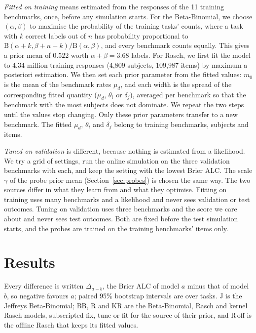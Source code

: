 \documentclass{article}
\begin{document}
\emph{Fitted on training} means estimated from the responses of the 11 training benchmarks, once, before any simulation starts. For the Beta-Binomial, we choose $(\alpha,\beta)$ to maximise the probability of the training tasks' counts, where a task with $k$ correct labels out of $n$ has probability proportional to $\mathrm{B}(\alpha+k,\beta+n-k)/\mathrm{B}(\alpha,\beta)$, and every benchmark counts equally. This gives a prior mean of $0.522$ worth $\alpha+\beta=3.68$ labels. For Rasch, we first fit the model to $4.34$ million training responses (4,809 subjects, 109,987 items) by maximum a posteriori estimation. We then set each prior parameter from the fitted values: $m_0$ is the mean of the benchmark rates $\mu_d$, and each width is the spread of the corresponding fitted quantity ($\mu_d$, $\theta_i$ or $\delta_j$), averaged per benchmark so that the benchmark with the most subjects does not dominate. We repeat the two steps until the values stop changing. Only these prior parameters transfer to a new benchmark. The fitted $\mu_d$, $\theta_i$ and $\delta_j$ belong to training benchmarks, subjects and items.

\emph{Tuned on validation} is different, because nothing is estimated from a likelihood. We try a grid of settings, run the online simulation on the three validation benchmarks with each, and keep the setting with the lowest Brier ALC. The scale $\gamma$ of the probe prior mean (Section~\ref{sec:probes}) is chosen the same way. The two sources differ in what they learn from and what they optimise. Fitting on training uses many benchmarks and a likelihood and never sees validation or test outcomes. Tuning on validation uses three benchmarks and the score we care about and never sees test outcomes. Both are fixed before the test simulation starts, and the probes are trained on the training benchmarks' items only.

\section{Results}\label{sec:results}

Every difference is written $\Delta_{a-b}$, the Brier ALC of model $a$ minus that of model $b$, so negative favours $a$; paired 95\% bootstrap intervals are over tasks. J is the Jeffreys Beta-Binomial; BB, R and KR are the Beta-Binomial, Rasch and kernel Rasch models, subscripted fix, tune or fit for the source of their prior, and R\,off is the offline Rasch that keeps its fitted values.
\end{document}
